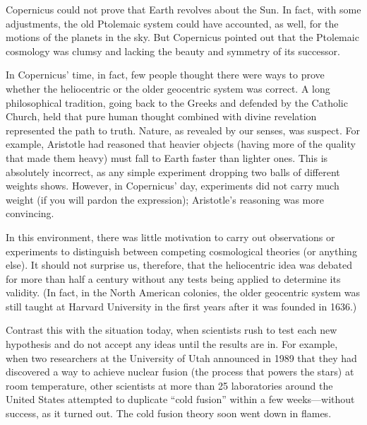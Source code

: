 \documentclass[../../main-astronomy.tex]{subfiles}
\begin{document}
\vspace{1em}

Copernicus could not prove that Earth revolves about the Sun. In fact, with some adjustments, the old Ptolemaic system could have accounted, as well, for the motions of the planets in the sky. But Copernicus pointed out that the Ptolemaic cosmology was clumsy and lacking the beauty and symmetry of its successor.

\vspace{1em}

In Copernicus' time, in fact, few people thought there were ways to prove whether the heliocentric or the older geocentric system was correct. A long philosophical tradition, going back to the Greeks and defended by the Catholic Church, held that pure human thought combined with divine revelation represented the path to truth. Nature, as revealed by our senses, was suspect. For example, Aristotle had reasoned that heavier objects (having more of the quality that made them heavy) must fall to Earth faster than lighter ones. This is absolutely incorrect, as any simple experiment dropping two balls of different weights shows. However, in Copernicus' day, experiments did not carry much weight (if you will pardon the expression); Aristotle's reasoning was more convincing.

\vspace{1em}

In this environment, there was little motivation to carry out observations or experiments to distinguish between competing cosmological theories (or anything else). It should not surprise us, therefore, that the heliocentric idea was debated for more than half a century without any tests being applied to determine its validity. (In fact, in the North American colonies, the older geocentric system was still taught at Harvard University in the first years after it was founded in 1636.)

\vspace{1em}

Contrast this with the situation today, when scientists rush to test each new hypothesis and do not accept any ideas until the results are in. For example, when two researchers at the University of Utah announced in 1989 that they had discovered a way to achieve nuclear fusion (the process that powers the stars) at room temperature, other scientists at more than 25 laboratories around the United States attempted to duplicate ``cold fusion'' within a few weeks---without success, as it turned out. The cold fusion theory soon went down in flames.
\end{document}
